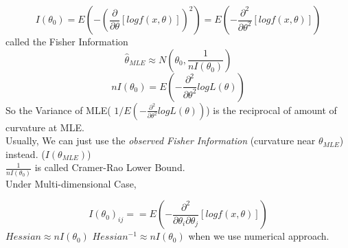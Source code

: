 \documentclass[11pt, openany]{book}              %
\begin{document}
\begin{itemize}
\begin{enumerate}
    		$$ I(\theta_0) = E( -(\frac{\partial}{\partial \theta} [log f(x, \theta ) ])^2)=E(-\frac{\partial^2}{\partial \theta^2} [log f(x, \theta ) ] )$$ called the Fisher Information
    		$$ \hat{\theta}_{MLE} \approx N(\theta_0, \frac{1}{n I(\theta_0)})$$
    		$$ n I(\theta_0) = E( -\frac{\partial^2}{\partial \theta^2} log L(\theta) )$$
    		So the Variance of MLE( $1/ E( -\frac{\partial^2}{\partial \theta^2} log L(\theta) )$) is the reciprocal of amount of curvature at MLE. \\
    		Usually, We can just use the \textit{observed Fisher Information} (curvature near $\theta_{MLE}$) instead. ($I(\theta_{MLE})$) \\
    		$\frac{1}{ n I(\theta_0)}$ is called Cramer-Rao Lower Bound. \\ Under Multi-dimensional Case, 
    		
    		$$ I(\theta_0)_{ij} = =E(-\frac{\partial^2}{\partial \theta_i \partial \theta_j} [log f(x, \theta ) ] )$$ $Hessian \approx nI(\theta_0)$ $Hessian^{-1} \approx nI(\theta_0)$ when we use numerical approach. 


\end{enumerate}
\end{itemize}
\end{document}
